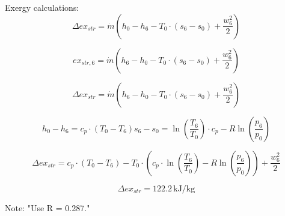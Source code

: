 Exergy calculations:  
\[
\Delta ex_{str} = \dot{m} \left( h_0 - h_6 - T_0 \cdot (s_6 - s_0) + \frac{w_6^2}{2} \right)  
\]

\[
ex_{str,6} = \dot{m} \left( h_6 - h_0 - T_0 \cdot (s_6 - s_0) + \frac{w_6^2}{2} \right)  
\]

\[
\Delta ex_{str} = \dot{m} \left( h_6 - h_0 - T_0 \cdot (s_6 - s_0) + \frac{w_6^2}{2} \right)  
\]

\[
h_0 - h_6 = c_p \cdot (T_0 - T_6)  
s_6 - s_0 = \ln \left( \frac{T_6}{T_0} \right) \cdot c_p - R \ln \left( \frac{p_6}{p_0} \right)  
\]

\[
\Delta ex_{str} = c_p \cdot (T_0 - T_6) - T_0 \cdot \left( c_p \cdot \ln \left( \frac{T_6}{T_0} \right) - R \ln \left( \frac{p_6}{p_0} \right) \right) + \frac{w_6^2}{2}  
\]

\[
\Delta ex_{str} = 122.2 \, \text{kJ/kg}  
\]  

Note: "Use R = 0.287."